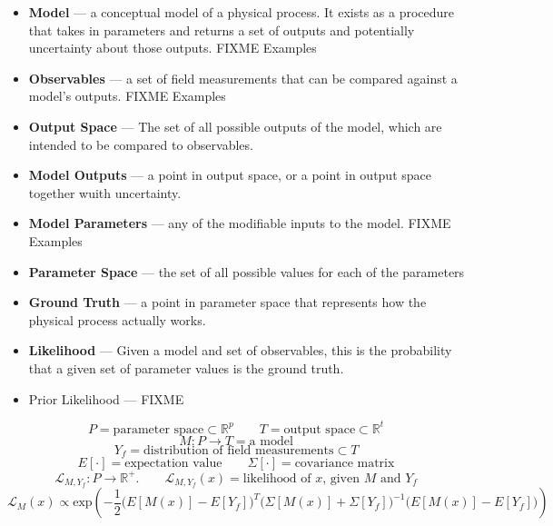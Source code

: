 \documentclass{article}
\begin{document}
\begin{itemize}

\item \textbf{Model} — a conceptual model of a physical process.  It exists as
  a procedure that takes in parameters and returns a set of
  outputs and potentially uncertainty about those outputs. FIXME Examples
 
\item \textbf{Observables} — a set of field measurements that can be compared
  against a model's outputs. FIXME Examples

\item \textbf{Output Space} — The set of all possible outputs of the model,
  which are intended to be compared to observables.

\item \textbf{Model Outputs} — a point in output space, or a point in output
  space together wuith uncertainty.

\item \textbf{Model Parameters} — any of the modifiable inputs to the
  model. FIXME Examples

\item \textbf{Parameter Space} — the set of all possible values for each of the
  parameters

\item \textbf{Ground Truth} — a point in parameter space that represents how
  the physical process actually works.

\item \textbf{Likelihood} — Given a model and set of observables, this is the
  probability that a given set of parameter values is the ground truth.

\item Prior Likelihood — FIXME
\end{itemize}

\newpage

\[ P = \textrm{parameter space} ⊂ ℝ^p \qquad
 T = \textrm{output space} ⊂ ℝ^t \]
\[ M: P → T  = \textrm{a model} \]
\[ Y_f = \textrm{distribution of field measurements} ⊂ T \]
\[ E[·] = \textrm{expectation value} \qquad Σ[·] = \textrm{covariance matrix} \]
\[ ℒ_{M,Y_f}: P → ℝ^+. \qquad
 ℒ_{M,Y_f}(x) = \textrm{likelihood of $x$, given $M$ and $Y_f$} \]
\[
ℒ_M(x) ∝ \textrm{exp}\left({-\frac{1}{2}\big(E[M(x)]-E[Y_f]\big)^T \big(Σ[M(x)]+Σ[Y_f]\big)^{-1} \big(E[M(x)]-E[Y_f]\big)}\right)
\]
\end{document}
